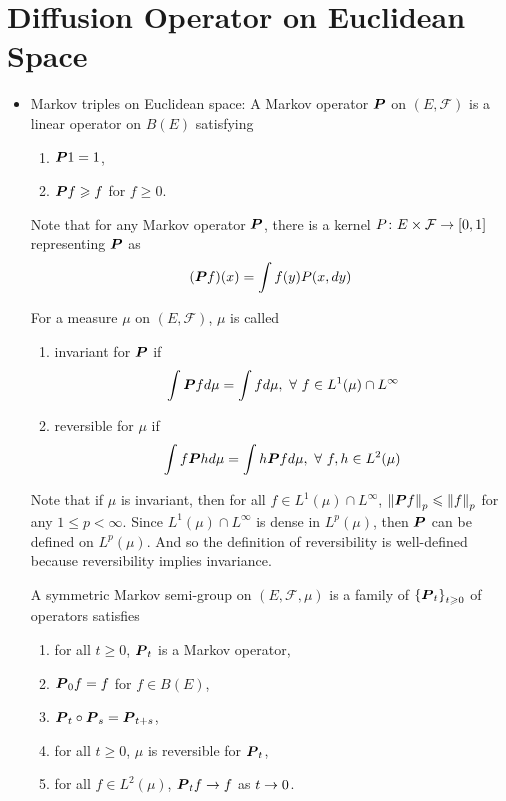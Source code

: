 \documentclass[a4paper,12pt]{article}
\begin{document}
\section{Diffusion Operator on Euclidean Space}

\begin{itemize}
  \item Markov triples on Euclidean space: A Markov operator $\boldsymbol{P}$ on $(E, \mathcal{F})$ is a linear operator on $B(E)$ satisfying
  \begin{enumerate}[label=(\roman*)]
    \item $\boldsymbol{P}1 = 1$,
    \item $\boldsymbol{P}f \geqslant f$ for $f \geqslant 0$.
  \end{enumerate}
  \begin{rmk}
    Note that for any Markov operator $\boldsymbol{P}$, there is a kernel $P \colon E \times \mathcal{F} \rightarrow [0,1]$ representing $\boldsymbol{P}$ as
    \begin{equation*}
      (\boldsymbol{P}f)(x) = \int f(y) P(x,dy)
    \end{equation*}
  \end{rmk}
  
  \noindent For a measure $\mu$ on $(E, \mathcal{F})$, $\mu$ is called
  \begin{enumerate}[label=(\roman*)]
    \item invariant for $\boldsymbol{P}$ if
    \begin{equation*}
      \int \boldsymbol{P}f d\mu = \int f d\mu,~\forall~f \in L^1(\mu)\cap L^\infty
    \end{equation*}
    \item reversible for $\mu$ if
    \begin{equation*}
      \int f\boldsymbol{P}h d\mu = \int h\boldsymbol{P}f d\mu,~\forall~f,h \in L^2(\mu)
    \end{equation*}
  \end{enumerate}
  \begin{rmk}
    Note that if $\mu$ is invariant, then for all $f \in L^1(\mu)\cap L^\infty$, $\left\lVert\boldsymbol{P}f\right\lVert_p \leqslant \left\lVert f\right\lVert_p$ for any $1\leqslant p < \infty$. Since $L^1(\mu)\cap L^\infty$ is dense in $L^p(\mu)$, then $\boldsymbol{P}$ can be defined on $L^p(\mu)$. And so the definition of reversibility is well-defined because reversibility implies invariance.
  \end{rmk}


  \noindent A symmetric Markov semi-group on $(E, \mathcal{F}, \mu)$ is a family of $\left\{\boldsymbol{P}_t\right\}_{t \geqslant 0}$ of operators satisfies
  \begin{enumerate}[label=(\roman*)]
    \item for all $t \geqslant 0$, $\boldsymbol{P}_t$ is a Markov operator,
    \item $\boldsymbol{P}_0f = f$ for $f \in B(E)$,
    \item $\boldsymbol{P}_t \circ \boldsymbol{P}_s = \boldsymbol{P}_{t+s}$,
    \item for all $t \geqslant 0$, $\mu$ is reversible for $\boldsymbol{P}_t$,
    \item for all $f \in L^2(\mu)$, $\boldsymbol{P}_t f \rightarrow f$ as $t \rightarrow 0$.
  \end{enumerate}
  

\end{itemize}
\end{document}

